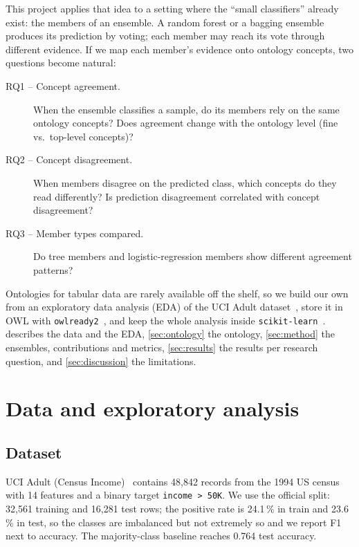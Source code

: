 \documentclass[11pt,a4paper]{article}
\newcommand{\code}[1]{\texttt{#1}}
\begin{document}
This project applies that idea to a setting where the ``small classifiers'' already exist: the members of an
ensemble. A random forest or a bagging ensemble produces its prediction by voting; each member may reach its vote
through different evidence. If we map each member's evidence onto ontology concepts, two questions become
natural:

\begin{description}
  \item[RQ1 -- Concept agreement.] When the ensemble classifies a sample, do its members rely on the same
    ontology concepts? Does agreement change with the ontology level (fine vs.\ top-level concepts)?
  \item[RQ2 -- Concept disagreement.] When members disagree on the predicted class, which concepts do they read
    differently? Is prediction disagreement correlated with concept disagreement?
  \item[RQ3 -- Member types compared.] Do tree members and logistic-regression members show different agreement
    patterns?
\end{description}

Ontologies for tabular data are rarely available off the shelf, so we build our own from an exploratory data
analysis (EDA) of the UCI Adult dataset~\cite{kohavi1996adult}, store it in OWL with
\code{owlready2}~\cite{lamy2017owlready}, and keep the whole analysis inside \code{scikit-learn}~\cite{pedregosa2011sklearn}.
 describes the data and the EDA, \cref{sec:ontology} the ontology, \cref{sec:method} the ensembles,
contributions and metrics, \cref{sec:results} the results per research question, and \cref{sec:discussion} the
limitations.

\section{Data and exploratory analysis}\label{sec:data}

\subsection{Dataset}
UCI Adult (Census Income)~\cite{kohavi1996adult} contains 48{,}842 records from the 1994 US census with 14
features and a binary target \code{income > 50K}. We use the official split: 32{,}561 training and 16{,}281 test
rows; the positive rate is 24.1\,\% in train and 23.6\,\% in test, so the classes are imbalanced but not extremely
so and we report F1 next to accuracy. The majority-class baseline reaches 0.764 test accuracy.
\end{document}
